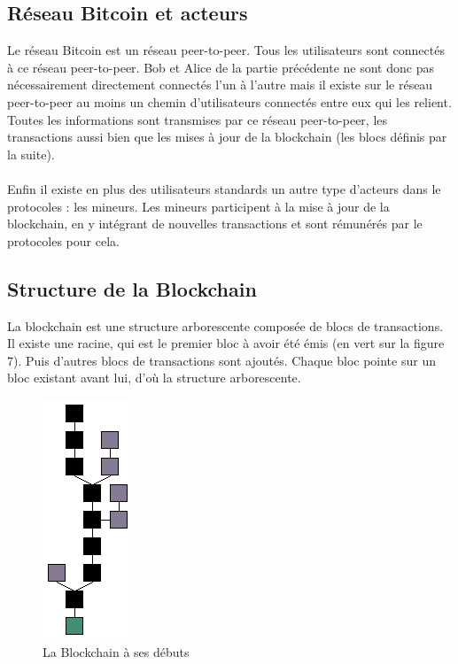 \documentclass[11pt,a4paper]{article}
\begin{document}
\subsection{Réseau Bitcoin et acteurs}

Le réseau Bitcoin est un réseau peer-to-peer. Tous les utilisateurs sont connectés à ce réseau peer-to-peer. Bob et Alice de la partie précédente ne sont donc pas nécessairement directement connectés l'un à l'autre mais il existe sur le réseau peer-to-peer au moins un chemin d'utilisateurs connectés entre eux qui les relient. Toutes les informations sont transmises par ce réseau peer-to-peer, les transactions aussi bien que les mises à jour de la blockchain (les blocs définis par la suite).\\\\
Enfin il existe en plus des utilisateurs standards un autre type d'acteurs dans le protocoles : les mineurs. Les mineurs participent à la mise à jour de la blockchain, en y intégrant de nouvelles transactions et sont rémunérés par le protocoles pour cela.



\subsection{Structure de la Blockchain}

La blockchain est une structure arborescente composée de blocs de transactions. Il existe une racine, qui est le premier bloc à avoir été émis (en vert sur la figure 7). Puis d'autres blocs de transactions sont ajoutés. Chaque bloc pointe sur un bloc existant avant lui, d'où la structure arborescente.

\begin{figure}[H]
\begin{center}
\includegraphics[scale=1]{blockchain.png}
\caption{La Blockchain à ses débuts}
\end{center}
\end{figure}
\end{document}
